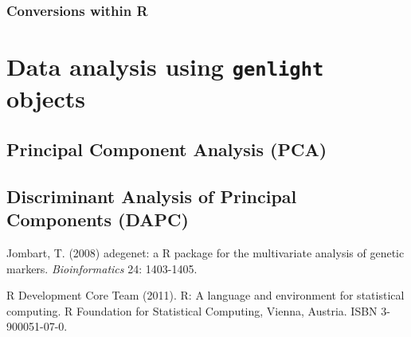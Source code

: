 \documentclass{article}
\begin{document}
\subsubsection{Conversions within R}



\section{Data analysis using \texttt{genlight} objects}

\subsection{Principal Component Analysis (PCA)}



\subsection{Discriminant Analysis of Principal Components (DAPC)}







\begin{thebibliography}{9}

  Jombart, T. (2008) adegenet: a R package for the multivariate
  analysis of genetic markers. \textit{Bioinformatics} 24: 1403-1405.

  R Development Core Team (2011). R: A language and environment for
  statistical computing. R Foundation for Statistical Computing,
  Vienna, Austria. ISBN 3-900051-07-0.

\end{thebibliography}
\end{document}
